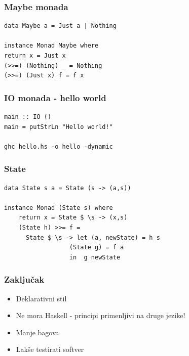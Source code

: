 \documentclass{beamer}
\begin{document}
\begin{frame}[fragile]
  \frametitle{Maybe monada}
  \begin{lstlisting}
data Maybe a = Just a | Nothing

instance Monad Maybe where 
return x = Just x
(>>=) (Nothing) _ = Nothing
(>>=) (Just x) f = f x
  \end{lstlisting}
\end{frame}

\begin{frame}[fragile]
  \frametitle{IO monada - hello world}
  \begin{lstlisting}
main :: IO ()
main = putStrLn "Hello world!" 

ghc hello.hs -o hello -dynamic 

  \end{lstlisting}
\end{frame}

  

\begin{frame}[fragile]
  \frametitle{State}
  \begin{lstlisting}
data State s a = State (s -> (a,s))  

instance Monad (State s) where 
    return x = State $ \s -> (x,s)  
    (State h) >>= f = 
      State $ \s -> let (a, newState) = h s  
                  (State g) = f a  
                  in  g newState  

  \end{lstlisting}
\end{frame}

\begin{frame}
  \frametitle{Zaključak}
  \begin{itemize}
    \item Deklarativni stil
    \item Ne mora Haskell - principi primenljivi na druge jezike!
    \item Manje bagova 
    \item Lakše testirati softver
  \end{itemize}

  

\end{frame}
\end{document}

